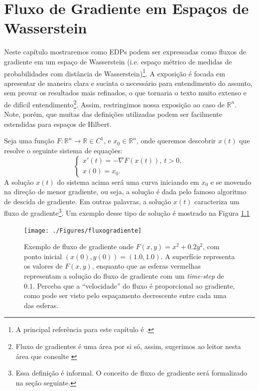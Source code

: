 \newpage
\chapter{Fluxo de Gradiente em Espaços de Wasserstein}

Neste capítulo mostraremos como EDPs podem ser expressadas como
fluxos de gradiente em um espaço de Wasserstein
(i.e. espaço métrico de medidas de probabilidades com distância
de Wasserstein)\footnote{A principal referência para este capítulo
é \citet{santambrogio2017euclidean}.}. A exposição é
focada em apresentar de maneira clara e sucinta o necessário para entendimento
do assunto, sem provar os resultados mais refinados, o que tornaria o
texto muito extenso e de difícil
entendimento\footnote{Fluxo de gradientes é uma área por si só, assim, sugerimos ao leitor nesta área
que consulte \citet{ambrosio2008gradient}}. Assim, restringimos
nossa exposição ao caso de $\mathbb R^n$. Note, porém, que muitas das definições
utilizadas podem ser facilmente estendidas para espaços de Hilbert.

Seja uma função $F:\mathbb R^n \to \mathbb R \in C^1$, e $x_0 \in \mathbb R^n$,
onde queremos descobrir $x(t)$ que resolve o seguinte sistema de equações:
\begin{equation}
    \begin{cases}
        x'(t) = -\nabla F(x(t)), \ t>0,\\
        x(0)  = x_0.
    \end{cases}
\end{equation}
A solução $x(t)$ do sistema acima será uma curva iniciando em $x_0$ e se movendo
na direção de menor gradiente, ou seja, a solução é dada
pelo famoso algoritmo de descida de gradiente. Em outras palavras,
a solução $x(t)$ caracteriza um fluxo de gradiente\footnote{Essa definição é informal. O conceito
de fluxo de gradiente será formalizado na seção seguinte.}.
Um exemplo desse tipo de solução é mostrado na Figura \ref{fig:fluxogradiente}

\begin{figure}[H]
\begin{center}
    \texttt{[image: ./Figures/fluxogradiente]}
\end{center}
    \caption{Exemplo de fluxo de gradiente onde $F(x,y) = x^2 + 0.2 y^2$,
    com ponto inicial $(x(0),y(0)) = (1.0,1.0)$. A superfície representa os valores
    de $F(x,y)$, enquanto que as esferas vermelhas representam a solução do fluxo de gradiente
    com um \textit{time-step} de $0.1$. Perceba que a ``velocidade'' do fluxo é proporcional ao 
    gradiente, como pode ser visto pelo espaçamento decrescente entre cada uma das esferas.}
    \label{fig:fluxogradiente}
\end{figure}

